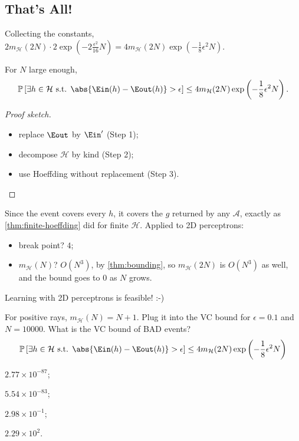 \subsection{That's All!}

Collecting the constants, \(2 m_{\mathcal{H}}(2N) \cdot 2 \exp(-2
\frac{\epsilon^2}{16} N) = 4 m_{\mathcal{H}}(2N) \exp(-\frac{1}{8} \epsilon^2
N)\).

\begin{theorem}\label{thm:vc}
    For \(N\) large enough,
    \[
        \mathbb{P}\left[ \exists h \in \mathcal{H} \text{ s.t. }
        \abs{\Ein(h) - \Eout(h)} > \epsilon \right]
        \le 4 m_{\mathcal{H}}(2N) \exp \left( -\frac{1}{8} \epsilon^2 N
        \right) .
    \]
\end{theorem}

\begin{proof}[Proof sketch]
    \leavevmode
    \begin{itemize}
        \item replace \(\Eout\) by \(\Ein'\) (Step 1);
        \item decompose \(\mathcal{H}\) by kind (Step 2);
        \item use Hoeffding without replacement (Step 3). \qedhere
    \end{itemize}
\end{proof}

Since the event covers every \(h\), it covers the \(g\) returned by any
\(\mathcal{A}\), exactly as \autoref{thm:finite-hoeffding} did for finite
\(\mathcal{H}\). Applied to 2D perceptrons:

\begin{itemize}
    \item break point? \(4\);
    \item \(m_{\mathcal{H}}(N)\)? \(O(N^3)\), by \autoref{thm:bounding}, so
        \(m_{\mathcal{H}}(2N)\) is \(O(N^3)\) as well, and the bound goes to
        \(0\) as \(N\) grows.
\end{itemize}

\begin{moral}
    Learning with 2D perceptrons is feasible! :-)
\end{moral}

\begin{exercise}
    For positive rays, \(m_{\mathcal{H}}(N) = N + 1\). Plug it into the VC
    bound for \(\epsilon = 0.1\) and \(N = 10000\). What is the VC bound of
    BAD events?
    \[
        \mathbb{P}\left[ \exists h \in \mathcal{H} \text{ s.t. }
        \abs{\Ein(h) - \Eout(h)} > \epsilon \right]
        \le 4 m_{\mathcal{H}}(2N) \exp \left( -\frac{1}{8} \epsilon^2 N
        \right)
    \]
    \begin{enumerate*}[(1)]
        \item \(2.77 \times 10^{-87}\); \item \(5.54 \times 10^{-83}\);
        \item \(2.98 \times 10^{-1}\); \item \(2.29 \times 10^{2}\).
    \end{enumerate*}
\end{exercise}

